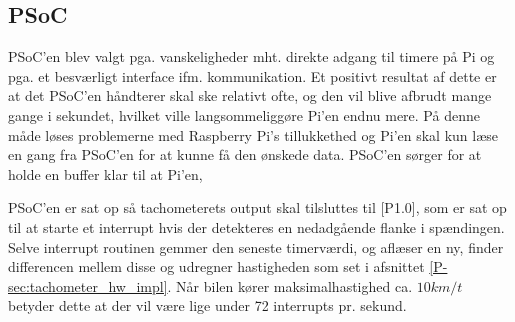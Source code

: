 \subsection{PSoC} \label{sec:swd_psoc_board}

PSoC'en blev valgt pga. vanskeligheder mht. direkte adgang til timere på Pi og pga. et besværligt interface ifm. \IIC kommunikation. Et positivt resultat af dette er at det PSoC'en håndterer skal ske relativt ofte, og den vil blive afbrudt mange gange i sekundet, hvilket ville langsommeliggøre Pi'en endnu mere. På denne måde løses problemerne med Raspberry Pi's tillukkethed og Pi'en skal kun læse en gang fra PSoC'en for at kunne få den ønskede data. PSoC'en sørger for at holde en buffer klar til at Pi'en,  


PSoC'en er sat op så tachometerets output skal tilsluttes til [P1.0], som er sat op til at starte et interrupt hvis der detekteres en nedadgående flanke i spændingen. Selve interrupt routinen gemmer den seneste timerværdi, og aflæser en ny, finder differencen mellem disse og udregner hastigheden som set i afsnittet \ref{P-sec:tachometer_hw_impl}. Når bilen kører maksimalhastighed ca. $10km/t$ betyder dette at der vil være lige under 72 interrupts pr. sekund. 